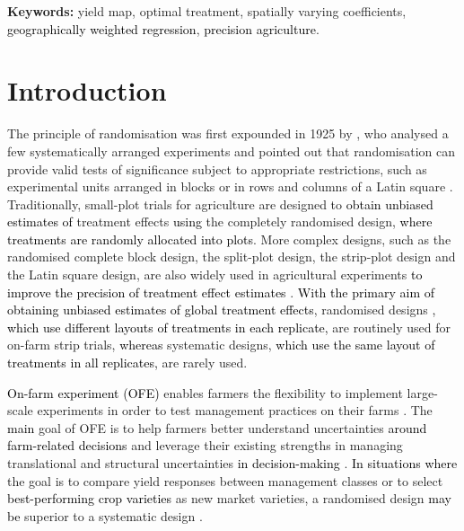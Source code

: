\documentclass[a4paper]{article} 	%
\newcommand{\revision}[1]{\textcolor{black}{#1}}
\newcommand{\zc}[1]{\textcolor{black}{#1}}
\begin{document}
 
{\bf Keywords:} yield map, optimal treatment, spatially varying coefficients, \revision{geographically weighted regression}, \revision{precision agriculture}. 

\section{Introduction}\label{Sec:Intro}

The principle of randomisation was first expounded in 1925 by \textcite{Fisher1934Statistical}, who analysed a few systematically arranged experiments and pointed out that randomisation can provide valid tests of significance subject to appropriate restrictions, such as experimental units arranged in blocks or in rows and columns of a Latin square \parencite{Verdooren2020History}. Traditionally, small-plot trials for agriculture are designed to \revision{obtain unbiased estimates of} treatment effects \revision{using} the completely randomised design, \zc{where treatments are randomly allocated into plots}. More complex designs, such as the randomised complete block design, the split-plot design, the strip-plot design and the Latin square design, are also widely used in agricultural experiments \revision{to improve the precision of treatment effect estimates} \parencite{Petersen1994Agricultural}. \revision{With the primary aim of obtaining unbiased estimates of global treatment effects}, randomised designs \zc{, which use different layouts of treatments in each replicate,} are routinely used for on-farm strip trials, \revision{whereas} systematic designs, \zc{which use the same layout of treatments in all replicates,} are rarely used.



\revision{On-farm experiment (OFE)} enables farmers the flexibility to implement large-scale experiments in order to test management practices on their farms \parencite{Evans2020Assessment}. The \revision{main} goal of OFE is to help farmers better understand uncertainties \revision{around farm-related decisions} and leverage their existing strengths in managing translational and structural uncertainties \revision{in decision-making} \parencite{Cook2013Onfarm}. \revision{In situations where} the goal is to compare yield responses between management classes or to select \revision{best-performing crop varieties} as new market varieties, a randomised design \revision{may be} superior to a systematic design \parencite{Pringle2004FieldScale, Selle2019Flexible}. 
\end{document}
